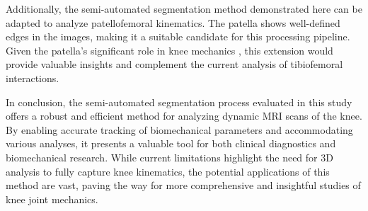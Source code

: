 \documentclass{micro-econ-thesis}
\begin{document}
Additionally, the semi-automated segmentation method demonstrated here can be adapted to analyze patellofemoral kinematics. The patella shows well-defined edges in the images, making it a suitable candidate for this processing pipeline. Given the patella's significant role in knee mechanics \parencite{powers_evidence-based_2017}, this extension would provide valuable insights and complement the current analysis of tibiofemoral interactions.

In conclusion, the semi-automated segmentation process evaluated in this study offers a robust and efficient method for analyzing dynamic MRI scans of the knee. By enabling accurate tracking of biomechanical parameters and accommodating various analyses, it presents a valuable tool for both clinical diagnostics and biomechanical research. While current limitations highlight the need for 3D analysis to fully capture knee kinematics, the potential applications of this method are vast, paving the way for more comprehensive and insightful studies of knee joint mechanics.
\cleardoublepage
{}
{} %
\printbibliography

%
%
%
%

\makeThesisDeclaration
\end{document}
